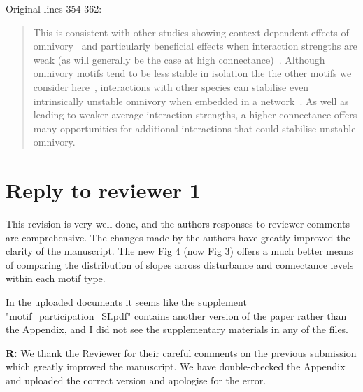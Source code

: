 \documentclass[12pt]{article}
\newenvironment{refquote}{\bigskip \begin{it}}{\end{it}\medskip}
\begin{document}
    Original lines 354-362:

    \begin{quotation}
    This is consistent with other studies showing context-dependent effects of omnivory~\citep{Bascompte2005,Monteiro2016} and particularly beneficial effects when interaction strengths are weak (as will generally be the case at high connectance)~\citep{Emmerson2004}. Although omnivory motifs tend to be less stable in isolation the the other motifs we consider here~\citep{Borrelli2015a}, interactions with other species can stabilise even intrinsically unstable omnivory when embedded in a network~\citep{Kratina2012}. As well as leading to weaker average interaction strengths, a higher connectance offers many opportunities for additional interactions that could stabilise unstable omnivory.
    \end{quotation}


\clearpage


\section*{Reply to reviewer 1}

    \begin{refquote}

        This revision is very well done, and the authors responses to reviewer comments are comprehensive. The changes made by the authors have greatly improved the clarity of the manuscript. The new Fig 4 (now Fig 3) offers a much better means of comparing the distribution of slopes across disturbance and connectance levels within each motif type.

        In the uploaded documents it seems like the supplement "motif\_participation\_SI.pdf" contains  another version of the paper rather than the Appendix, and I did not see the supplementary materials in any of the files.

    \end{refquote}

    \textbf{R:} We thank the Reviewer for their careful comments on the previous submission which greatly improved the manuscript. We have double-checked the Appendix and uploaded the correct version and apologise for the error.


\clearpage

\clearpage

     
\end{document}
